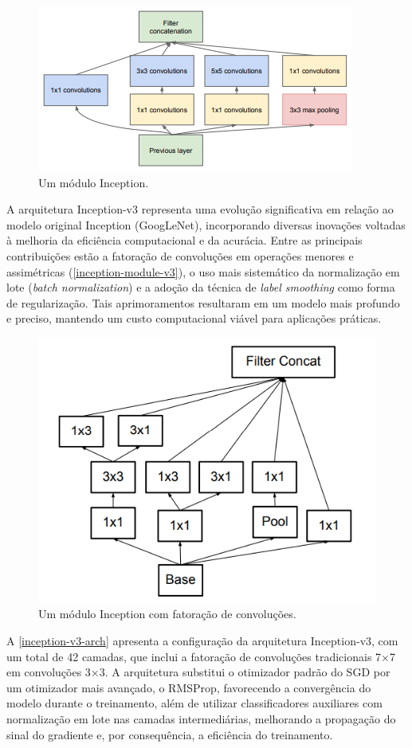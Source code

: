 \begin{figure}[h]
    \centering
    \includegraphics[width=0.5\linewidth]{figs/inception-module.png}
    \caption{Um módulo Inception.}
    \label{inception-module}
\end{figure}

A arquitetura Inception-v3 \citep{Szegedy2016} representa uma evolução significativa em relação ao modelo original Inception (GoogLeNet), incorporando diversas inovações voltadas à melhoria da eficiência computacional e da acurácia. Entre as principais contribuições estão a fatoração de convoluções em operações menores e assimétricas (\autoref{inception-module-v3}), o uso mais sistemático da normalização em lote (\textit{batch normalization}) e a adoção da técnica de \textit{label smoothing} como forma de regularização. Tais aprimoramentos resultaram em um modelo mais profundo e preciso, mantendo um custo computacional viável para aplicações práticas.

\begin{figure}[h]
    \centering
    \includegraphics[width=0.5\linewidth]{figs/inception-module-v3.png}
    \caption{Um módulo Inception com fatoração de convoluções.}
    \label{inception-module-v3}
\end{figure}

A \autoref{inception-v3-arch} apresenta a configuração da arquitetura Inception-v3, com um total de 42 camadas, que inclui a fatoração de convoluções tradicionais 7×7 em convoluções 3×3. A arquitetura substitui o otimizador padrão do SGD por um otimizador mais avançado, o RMSProp, favorecendo a convergência do modelo durante o treinamento, além de utilizar classificadores auxiliares com normalização em lote nas camadas intermediárias, melhorando a propagação do sinal do gradiente e, por consequência, a eficiência do treinamento.

